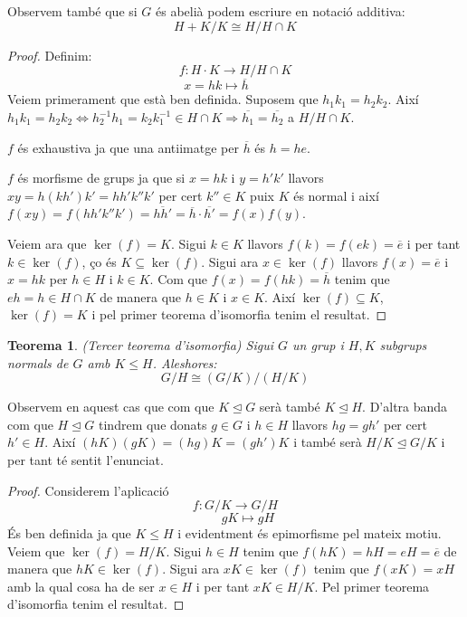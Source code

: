 \documentclass[a4paper,11pt]{report}
\newcommand{\inv}[1]{#1^{-1}}
\renewcommand{\bar}{\overline}
\renewcommand{\implies}{\Leftrightarrow}
\theoremstyle{theorem}
\newtheorem{teorema}{\normalfont \sffamily\bfseries Teorema}[section]
\theoremstyle{definition}
\begin{document}
Observem també que si $G$ és abelià podem escriure en notació additiva:
$$H+ K/K\cong H/H\cap K$$
\begin{proof}
	Definim:
	$$f:H\cdot K\longrightarrow H/H\cap K$$
	$$x=hk\longmapsto \bar{h}\quad\qquad$$
	Veiem primerament que està ben definida. Suposem que $h_1k_1=h_2k_2$. Així $h_1k_1=h_2k_2\implies\inv{h_2}h_1=k_2\inv{k_1}\in H\cap K\Rightarrow \bar{h_1}=\bar{h_2}$ a $H/H\cap K$. 
	
	$f$ és exhaustiva ja que una antiimatge per $\bar{h}$ és $h=he$.
	
	$f$ és morfisme de grups ja que si $x=hk$ i $y=h'k'$ llavors $xy=h(kh')k'=hh'k''k'$ per cert $k''\in K$ puix $K$ és normal i així $f(xy)=f(hh'k''k')=\bar{hh'}=\bar{h}\cdot \bar{h'}=f(x)f(y)$. 
	
	Veiem ara que $\ker(f)=K$. Sigui $k\in K$ llavors $f(k)=f(ek)=\bar{e}$ i per tant $k\in \ker(f)$, ço és $K\subseteq \ker(f)$. Sigui ara $x\in\ker(f)$ llavors $f(x)=\bar{e}$ i $x=hk$ per $h\in H$ i $k\in K$. Com que $f(x)=f(hk)=\bar{h}$ tenim que $eh=h\in H\cap K$ de manera que $h\in K$ i $x\in K$. Així $\ker(f)\subseteq K$, $\ker(f)= K$ i pel primer teorema d'isomorfia tenim el resultat.
\end{proof}
\begin{teorema}{(Tercer teorema d'isomorfia)}
	Sigui $G$ un grup i $H,K$ subgrups normals de $G$ amb $K\leq H$. Aleshores:
	$$G/H\cong (G/K)/(H/K)$$
\end{teorema}
Observem en aquest cas que com que $K\unlhd G$ serà també $K\unlhd H$. D'altra banda com que $H\unlhd G$ tindrem que donats $g\in G$ i $h\in H$ llavors $hg=gh'$ per cert $h'\in H$. Així $(hK)(gK)=(hg)K=(gh')K$ i també serà $H/K\unlhd G/K$ i per tant té sentit l'enunciat.
\begin{proof}
	Considerem l'aplicació $$f:G/K\longrightarrow G/H$$ $$\qquad gK\longmapsto gH$$
	És ben definida ja que $K\leq H$ i evidentment és epimorfisme pel mateix motiu. Veiem que $\ker(f)=H/K$. Sigui $h\in H$ tenim que $f(hK)=hH=eH=\bar{e}$ de manera que $hK\in\ker(f)$. Sigui ara $xK\in \ker(f)$ tenim que $f(xK)=xH$ amb la qual cosa ha de ser $x\in H$ i per tant $xK\in H/K$. Pel primer teorema d'isomorfia tenim el resultat. 
\end{proof}
\end{document}
